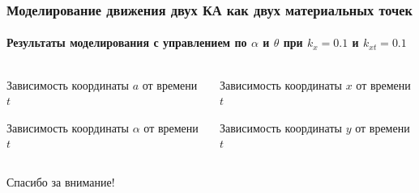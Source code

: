 \documentclass[10pt,pdf,hyperref={unicode}]{beamer}
\begin{document}
\begin{frame}
\frametitle{Моделирование движения двух КА как двух материальных точек}
\framesubtitle{Результаты моделирования с управлением по $\alpha$ и $\theta$ при $k_x = 0.1$ и $k_{x t} = 0.1$}
\begin{columns}[onlytextwidth]
	\begin{column}{0.5\textwidth}
		\begin{figure}[H]
		\end{figure}
		\scriptsize{Зависимость координаты $a$ от времени $t$}
		\begin{figure}[H]
		\end{figure} 
		\scriptsize{Зависимость координаты $\alpha$ от времени $t$}
	\end{column}
	\begin{column}{0.5\textwidth}
		\begin{figure}[H]
		\end{figure} 
		\scriptsize{Зависимость координаты $x$ от времени $t$}
		\begin{figure}[H]
		\end{figure} 
		\scriptsize{Зависимость координаты $y$ от времени $t$}
	\end{column}
\end{columns}
\end{frame}

\begin{frame}
	\begin{center}
		Спасибо за внимание!
	\end{center}
\end{frame}
\end{document}
